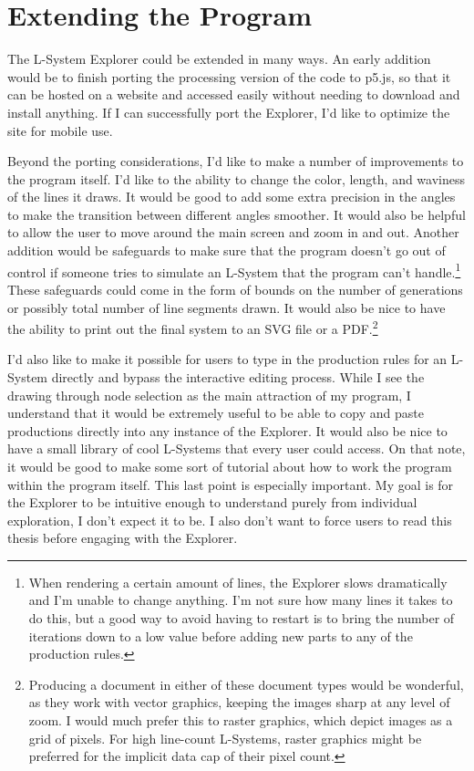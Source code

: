 \documentclass[12pt,twoside]{reedthesis}
\begin{document}
\section{Extending the Program}
\label{Extensions}

	The L-System Explorer could be extended in many ways. An early addition would be to finish porting the processing version of the code to p5.js, so that it can be hosted on a website and accessed easily without needing to download and install anything. If I can successfully port the Explorer, I'd like to optimize the site for mobile use.
	
	Beyond the porting considerations, I'd like to make a number of improvements to the program itself. I'd like to the ability to change the color, length, and waviness of the lines it draws. It would be good to add some extra precision in the angles to make the transition between different angles smoother. It would also be helpful to allow the user to move around the main screen and zoom in and out. Another addition would be safeguards to make sure that the program doesn't go out of control if someone tries to simulate an L-System that the program can't handle.\footnote{When rendering a certain amount of lines, the Explorer slows dramatically and I'm unable to change anything. I'm not sure how many lines it takes to do this, but a good way to avoid having to restart is to bring the number of iterations down to a low value before adding new parts to any of the production rules.} These safeguards could come in the form of bounds on the number of generations or possibly total number of line segments drawn. It would also be nice to have the ability to print out the final system to an SVG file or a PDF.\footnote{Producing a document in either of these document types would be wonderful, as they work with vector graphics, keeping the images sharp at any level of zoom. I would much prefer this to raster graphics, which depict images as a grid of pixels. For high line-count L-Systems, raster graphics might be preferred for the implicit data cap of their pixel count.} 
	
	I'd also like to make it possible for users to type in the production rules for an L-System directly and bypass the interactive editing process. While I see the drawing through node selection as the main attraction of my program, I understand that it would be extremely useful to be able to copy and paste productions directly into any instance of the Explorer. It would also be nice to have a small library of cool L-Systems that every user could access. On that note, it would be good to make some sort of tutorial about how to work the program within the program itself. This last point is especially important. My goal is for the Explorer to be intuitive enough to understand purely from individual exploration, I don't expect it to be. I also don't want to force users to read this thesis before engaging with the Explorer.
	
\end{document}
